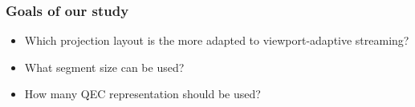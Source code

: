 \begin{frame}[c]
   \frametitle{Goals of our study}

   \vfill
   \begin{itemize}[<+->]
      \item Which projection layout is the more adapted to viewport-adaptive streaming?
      \vfill
      \item What segment size can be used?
      \vfill
      \item How many QEC representation should be used?
   \end{itemize}
   \vfill

\end{frame}
